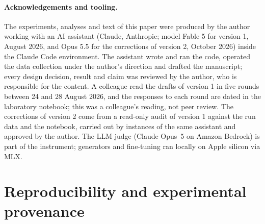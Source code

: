 \documentclass[11pt]{article}
\begin{document}
\paragraph{Acknowledgements and tooling.} The experiments, analyses and
text of this paper were produced by the author working with an AI
assistant (Claude, Anthropic; model Fable 5 for version 1, August 2026,
and Opus 5.5 for the corrections of version 2, October 2026) inside the
Claude Code environment. The assistant wrote and ran the code, operated
the data collection under the author's direction and drafted the
manuscript; every design decision, result and claim was reviewed by the
author, who is responsible for the content. A colleague read the drafts
of version 1 in five rounds between 24 and 28 August 2026, and the
responses to each round are dated in the laboratory notebook; this was a
colleague's reading, not peer review. The corrections of version 2 come
from a read-only audit of version 1 against the run data and the
notebook, carried out by instances of the same assistant and approved by
the author. The LLM judge (Claude Opus~5 on Amazon Bedrock) is part of
the instrument; generators and fine-tuning ran locally on Apple silicon
via MLX.

\appendix
\section{Reproducibility and experimental provenance}
\label{app:repro}
\end{document}
